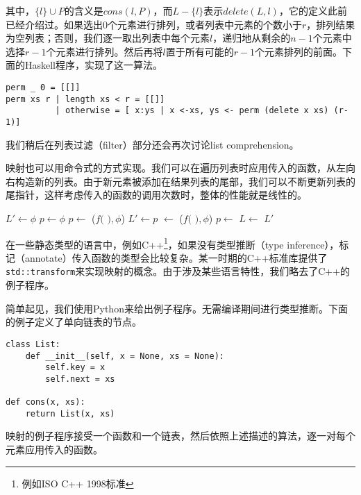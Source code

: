 \documentclass[UTF8]{article}
\begin{document}
其中，$\{l\} \cup P$的含义是$cons(l, P)$，而$L-\{l\}$表示$delete(L, l)$，它的定义此前已经介绍过。如果选出0个元素进行排列，或者列表中元素的个数小于$r$，排列结果为空列表；否则，我们逐一取出列表中每个元素$l$，递归地从剩余的$n-1$个元素中选择$r-1$个元素进行排列。然后再将$l$置于所有可能的$r-1$个元素排列的前面。下面的Haskell程序，实现了这一算法。

\lstset{language=Haskell}
\begin{lstlisting}
perm _ 0 = [[]]
perm xs r | length xs < r = [[]]
          | otherwise = [ x:ys | x <-xs, ys <- perm (delete x xs) (r-1)]
\end{lstlisting}

我们稍后在列表过滤（filter）部分还会再次讨论list comprehension。

映射也可以用命令式的方式实现。我们可以在遍历列表时应用传入的函数，从左向右构造新的列表。由于新元素被添加在结果列表的尾部，我们可以不断更新列表的尾指针，这样考虑传入的函数的调用次数时，整体的性能就是线性的。

\begin{algorithmic}[1]
  \State $L' \gets \phi$
  \State $p \gets \phi$
      \State $p \gets$ ($f($  $), \phi$)
      \State $L' \gets p$
    \Else
      \State {} $\gets$ ($f($  $), \phi$)
      \State $p \gets$ 
    \EndIf
    \State $L \gets$ 
  \EndWhile
  \State \Return $L'$
\EndFunction
\end{algorithmic}

在一些静态类型的语言中，例如C++\footnote{例如ISO C++ 1998标准}，如果没有类型推断（type inference），标记（annotate）传入函数的类型会比较复杂\cite{sgi-stl-transform}。某一时期的C++标准库提供了\verb|std::transform|来实现映射的概念。由于涉及某些语言特性，我们略去了C++的例子程序。

简单起见，我们使用Python来给出例子程序。无需编译期间进行类型推断。下面的例子定义了单向链表的节点。

\lstset{language=Python}
\begin{lstlisting}
class List:
    def __init__(self, x = None, xs = None):
        self.key = x
        self.next = xs

def cons(x, xs):
    return List(x, xs)
\end{lstlisting}

映射的例子程序接受一个函数和一个链表，然后依照上述描述的算法，逐一对每个元素应用传入的函数。
\end{document}
